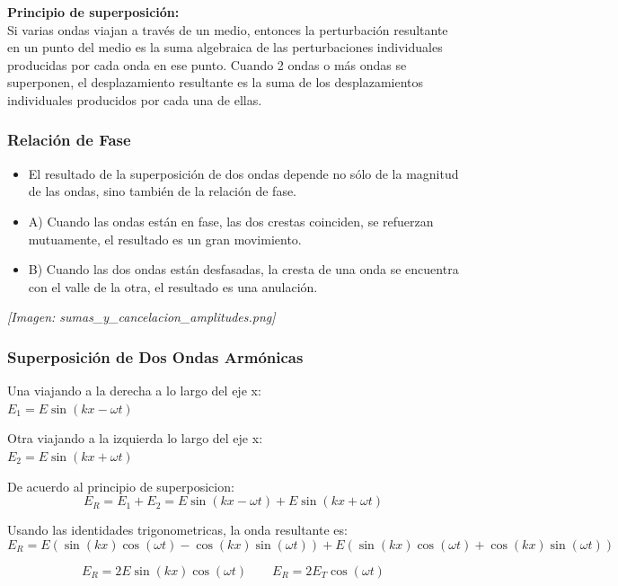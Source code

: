 \documentclass[12pt]{article}
\begin{document}
	\textbf{Principio de superposición:}\\
	Si varias ondas viajan a través de un medio, entonces la perturbación resultante en un punto del medio es la suma algebraica de las perturbaciones individuales producidas por cada onda en ese punto. Cuando 2 ondas o más ondas se superponen, el desplazamiento resultante es la suma de los desplazamientos individuales producidos por cada una de ellas.
	
	\subsubsection*{Relación de Fase}
	\begin{itemize}
		\item El resultado de la superposición de dos ondas depende no sólo de la magnitud de las ondas, sino también de la relación de fase.
		\item A) Cuando las ondas están en fase, las dos crestas coinciden, se refuerzan mutuamente, el resultado es un gran movimiento.
		\item B) Cuando las dos ondas están desfasadas, la cresta de una onda se encuentra con el valle de la otra, el resultado es una anulación.
	\end{itemize}
	\textit{[Imagen: sumas\_y\_cancelacion\_amplitudes.png]}
	
	\subsubsection*{Superposición de Dos Ondas Armónicas}
	Una viajando a la derecha a lo largo del eje x:\\
	$E_1 = E\sin(kx - \omega t)$
	
	Otra viajando a la izquierda lo largo del eje x:\\
	$E_2 = E\sin(kx + \omega t)$
	
	De acuerdo al principio de superposicion:
	\begin{equation*}
		E_R = E_1 + E_2 = E\sin(kx - \omega t) + E\sin(kx + \omega t)
	\end{equation*}
	
	Usando las identidades trigonometricas, la onda resultante es:
	\begin{equation*}
		E_R = E(\sin(kx)\cos(\omega t) - \cos(kx)\sin(\omega t)) + E(\sin(kx)\cos(\omega t) + \cos(kx)\sin(\omega t))
	\end{equation*}
	
	\begin{equation*}
		E_R = 2E\sin(kx)\cos(\omega t) \qquad E_R = 2E_T\cos(\omega t)
	\end{equation*}
	
\end{document}
